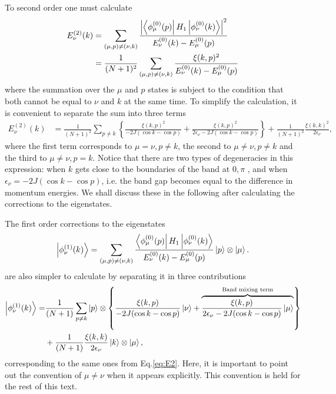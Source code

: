 \documentclass{article}
\begin{document}
To second order one must calculate
\begin{align}
    E_{\nu}^{(2)}(k) & = \sum_{(\mu,p)\neq(\nu,k)} \frac{\left|\bra{\phi^{(0)}_\mu (p)}H_1 \ket{\phi^{(0)}_\nu (k)}\right|^2}{ E_{\nu}^{(0)}(k) -  E_{\mu}^{(0)}(p)}\\
    & = \frac{1}{(N+1)^2}\sum_{(\mu,p)\neq(\nu,k)} \frac{ \xi(k,p)^2}{ E_{\nu}^{(0)}(k) -  E_{\mu}^{(0)}(p)}
\end{align}
where the summation over the $\mu$ and $p$ states is subject to the condition that 
both cannot be equal to $\nu$ and $k$ at the same time. To simplify the calculation,
 it is convenient to separate the sum into three terms
\begin{align}\label{eq:E2}
    E_{\nu}^{(2)}(k) & = \frac{1}{(N+1)^2}\sum_{p\neq k} \left \{ \frac{ \xi(k,p)^2}{ -2J( \cos k - \cos p ) } +  \frac{ \xi(k,p)^2}{ 2\epsilon_\nu -2J( \cos k - \cos p ) } \right \} + \frac{1}{(N+1)^2} \frac{\xi(k,k)^2}{2\epsilon_\nu},
\end{align}
where the first term corresponds to $\mu = \nu, p\neq k$, the second to $\mu \neq \nu, p\neq k$ and the third to $\mu \neq \nu, p = k$. Notice that there are two types of degeneracies in this expression: when $k$ gets close to the boundaries of the band at $0, \pi$ , and when $\epsilon_\nu = -2 J( \cos k -\cos p)$, i.e. the band gap becomes equal to the difference in momentum energies. We shall discuss these in the following after calculating the corrections to the eigenstates. 

The first order corrections to the eigenstates 
\begin{align}
    \ket{\phi_\nu^{(1)} (k)} = \sum_{(\mu,p)\neq(\nu,k)} \frac{\bra{\phi^{(0)}_\mu (p)}H_1 \ket{\phi^{(0)}_\nu (k)}}{ E_{\nu}^{(0)}(k) -  E_{\mu}^{(0)}(p)} \ket{p}\otimes \ket{\mu}.
\end{align} 
are also simpler to calculate by separating it in three contributions
\begin{align}\label{eq:psi_1}
    \ket{\phi_\nu^{(1)} (k)} = & \frac{1}{(N+1)}\sum_{p\neq k} \ket{p}\otimes \left \{ \frac{ \xi(k,p)}{ -2J( \cos k - \cos p ) } \ket{\nu} + \overbrace{\frac{ \xi(k,p)}{ 2\epsilon_\nu -2J( \cos k - \cos p )} \ket{\mu}}^{\text{Band mixing term}} \right \} \nonumber \\ 
    & + \frac{1}{(N+1)} \frac{\xi(k,k)}{2\epsilon_\nu} \ket{k}\otimes\ket{\mu},
\end{align}
corresponding to the same ones from Eq.\eqref{eq:E2}. Here, it is important to point out the convention of $\mu \neq \nu$ when it appears explicitly. This convention is held for the rest of this text.
\end{document}

